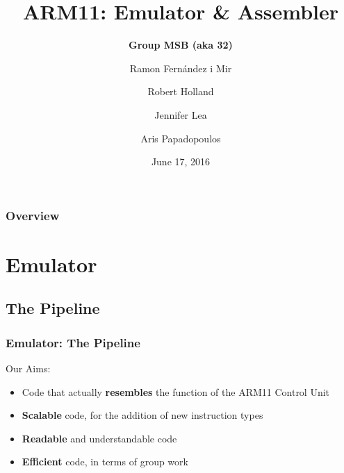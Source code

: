 \documentclass{beamer}
\title[Main Project]{ARM11: Emulator \& Assembler} %
\author[Group MSB]{
  \textbf{Group MSB (aka 32)}\\
  \and
  	Ramon Fern\'{a}ndez i Mir\\
  \and
  	Robert Holland\\
   \and
	Jennifer Lea \\
  \and
  	Aris Papadopoulos\\
}
\institute[ICL] {

Imperial College London \\ 

\medskip
}
\date{June 17, 2016}
\begin{document}
\begin{frame}
\titlepage
\end{frame}

\begin{frame}
\frametitle{Overview} 

\tableofcontents 

\end{frame}


\section{Emulator}

\subsection{The Pipeline} 
\begin{frame}
\frametitle{Emulator: The Pipeline}

\begin{large}
Our Aims:
\end{large}

\begin{itemize}

\item Code that actually \textbf{resembles} the function of the ARM11 Control Unit \\

\item \textbf{Scalable} code, for the addition of new instruction types \\

\item \textbf{Readable} and understandable code \\

\item \textbf{Efficient} code, in terms of group work

\end{itemize}

\end{frame}

\end{document}
